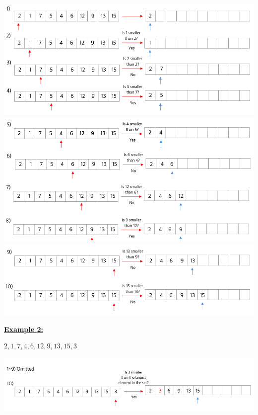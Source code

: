 \documentclass[12pt]{article}
\begin{document}
\begin{enumerate}[1.]
\begin{itemize}
\begin{itemize}
            \begin{center}
            \includegraphics[width=\linewidth]{images/worksheet_3_solution_21.png}
            \includegraphics[width=\linewidth]{images/worksheet_3_solution_22.png}
            \includegraphics[width=\linewidth]{images/worksheet_3_solution_23.png}
            \end{center}

            \bigskip

            \underline{\textbf{Example 2:}}

            \bigskip

            $2,1,7,4,6,12,9,13,15,3$

            \begin{center}
            \includegraphics[width=\linewidth]{images/worksheet_3_solution_24.png}
            \end{center}


\end{itemize}
\end{itemize}
\end{enumerate}
\end{document}
